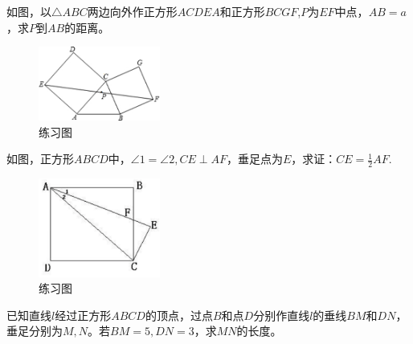 \documentclass{ecnuthesis}
\begin{document}
\begin{problem}
    如图，以$\triangle ABC$两边向外作正方形$ACDEA$和正方形$BCGF$,$P$为$EF$中点，$AB=a$，求$P$到$AB$的距离。\\
\end{problem}
\begin{figure}[H]
\centering
\includegraphics[width=4cm]{picture/627.png}
\caption{练习图}
\end{figure}
\begin{problem}
    如图，正方形$ABCD$中，$\angle 1=\angle 2,CE\perp AF$，垂足点为$E$，求证：$CE=\frac{1}{2}AF$.
\end{problem}
\begin{figure}[H]
\centering
\includegraphics[width=4cm]{picture/6116.png}
\caption{练习图}
\end{figure}
\begin{problem}
    已知直线$l$经过正方形$ABCD$的顶点，过点$B$和点$D$分别作直线$l$的垂线$BM$和$DN$，垂足分别为$M,N$。若$BM=5,DN=3$，求$MN$的长度。
\end{problem}
\clearpage
\end{document}
